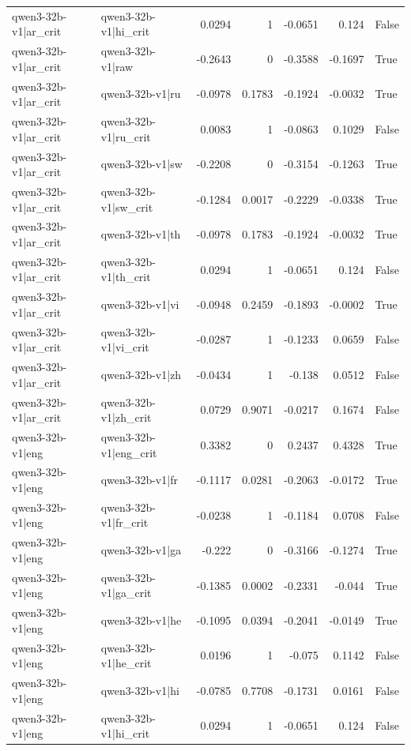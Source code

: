 \begin{table}
\begin{tabular}{l l r r r r l}
qwen3-32b-v1|ar_crit & qwen3-32b-v1|hi_crit & 0.0294 & 1 & -0.0651 & 0.124 & False \\
qwen3-32b-v1|ar_crit & qwen3-32b-v1|raw & -0.2643 & 0 & -0.3588 & -0.1697 & True \\
qwen3-32b-v1|ar_crit & qwen3-32b-v1|ru & -0.0978 & 0.1783 & -0.1924 & -0.0032 & True \\
qwen3-32b-v1|ar_crit & qwen3-32b-v1|ru_crit & 0.0083 & 1 & -0.0863 & 0.1029 & False \\
qwen3-32b-v1|ar_crit & qwen3-32b-v1|sw & -0.2208 & 0 & -0.3154 & -0.1263 & True \\
qwen3-32b-v1|ar_crit & qwen3-32b-v1|sw_crit & -0.1284 & 0.0017 & -0.2229 & -0.0338 & True \\
qwen3-32b-v1|ar_crit & qwen3-32b-v1|th & -0.0978 & 0.1783 & -0.1924 & -0.0032 & True \\
qwen3-32b-v1|ar_crit & qwen3-32b-v1|th_crit & 0.0294 & 1 & -0.0651 & 0.124 & False \\
qwen3-32b-v1|ar_crit & qwen3-32b-v1|vi & -0.0948 & 0.2459 & -0.1893 & -0.0002 & True \\
qwen3-32b-v1|ar_crit & qwen3-32b-v1|vi_crit & -0.0287 & 1 & -0.1233 & 0.0659 & False \\
qwen3-32b-v1|ar_crit & qwen3-32b-v1|zh & -0.0434 & 1 & -0.138 & 0.0512 & False \\
qwen3-32b-v1|ar_crit & qwen3-32b-v1|zh_crit & 0.0729 & 0.9071 & -0.0217 & 0.1674 & False \\
qwen3-32b-v1|eng & qwen3-32b-v1|eng_crit & 0.3382 & 0 & 0.2437 & 0.4328 & True \\
qwen3-32b-v1|eng & qwen3-32b-v1|fr & -0.1117 & 0.0281 & -0.2063 & -0.0172 & True \\
qwen3-32b-v1|eng & qwen3-32b-v1|fr_crit & -0.0238 & 1 & -0.1184 & 0.0708 & False \\
qwen3-32b-v1|eng & qwen3-32b-v1|ga & -0.222 & 0 & -0.3166 & -0.1274 & True \\
qwen3-32b-v1|eng & qwen3-32b-v1|ga_crit & -0.1385 & 0.0002 & -0.2331 & -0.044 & True \\
qwen3-32b-v1|eng & qwen3-32b-v1|he & -0.1095 & 0.0394 & -0.2041 & -0.0149 & True \\
qwen3-32b-v1|eng & qwen3-32b-v1|he_crit & 0.0196 & 1 & -0.075 & 0.1142 & False \\
qwen3-32b-v1|eng & qwen3-32b-v1|hi & -0.0785 & 0.7708 & -0.1731 & 0.0161 & False \\
qwen3-32b-v1|eng & qwen3-32b-v1|hi_crit & 0.0294 & 1 & -0.0651 & 0.124 & False \\

\end{tabular}
\end{table}
